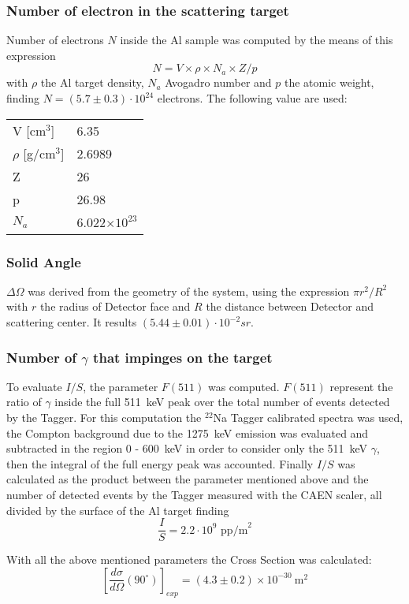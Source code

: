  \subsubsection*{Number of electron in the scattering target}
 Number of electrons $N$ inside the Al sample was computed by the means of this expression 
\[
N=V\times \rho\times N_a\times Z/p
\]
with $\rho$ the Al target density, $N_a$ Avogadro number and $p$  the atomic weight, finding $N=(5.7 \pm 0.3)\cdot10^{24}$ electrons. The following value are used:
\begin{table}[H]
\centering
\begin{tabular}{ll}
\toprule
\toprule
V [cm$^3$] & 6.35 \\
$\rho$ [g/cm$^3$] & 2.6989\\
Z & 26 \\
p & 26.98 \\
$N_a$ & 6.022$\times 10^{23}$ \\
\bottomrule
\bottomrule
\end{tabular}
\end{table}
 
\subsubsection*{Solid Angle }
$\Delta\Omega$ was derived from the geometry of the system, using the expression $\pi r^2/R^2$ with $r$ the radius of Detector face and $R$ the distance between Detector and scattering center. It results $(5.44\pm0.01)\cdot 10^{-2} sr$. 
  
\subsubsection*{Number of $\gamma$ that impinges on the target}
To evaluate $I/S$, the parameter $F(511)$ was computed. $F(511)$ represent the ratio of $\gamma$ inside the full 511~keV peak over the total number of events detected by the Tagger. For this computation the $^{22}$Na Tagger calibrated spectra was used, the Compton background due to the 1275~keV emission was evaluated and subtracted in the region 0 - 600~keV in order to consider only the 511~keV $\gamma$, then the integral of the full energy peak was accounted.
Finally $I/S$ was calculated as the product between the parameter mentioned above and the number of detected events by the Tagger measured with the CAEN scaler, all divided by the surface of the Al target finding 
\[\dfrac{I}{S} = 2.2\cdot10^{9} \text{ pp/m}^2\]

\bigskip

With all the above mentioned parameters the Cross Section was calculated:
  \begin{equation*}
  	\left[\frac{d\sigma}{d\Omega}(90^{\circ})\right]_{exp}=(4.3\pm0.2) \times 10^{-30}\ \text{m}^{2}
  \end{equation*}
  
  
 
